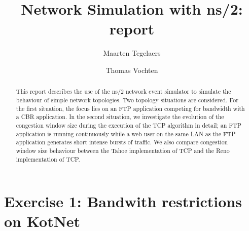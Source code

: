 \documentclass[a4paper,10pt]{article}
\title{Network Simulation with ns/2: report}
\author{Maarten Tegelaers \and Thomas Vochten}
\begin{document}
\maketitle

\begin{abstract}
This report describes the use of the ns/2 network event simulator to simulate the behaviour of simple network topologies.
Two topology situations are considered. For the first situation, the focus lies on an FTP application competing for bandwidth
with a CBR application. In the second situation, we investigate the evolution of the congestion window size during the
execution of the TCP algorithm in detail; an FTP application is running continuously while a web user on the same LAN as
the FTP application generates short intense bursts of traffic. We also compare congestion window size behaviour between
the Tahoe implementation of TCP and the Reno implementation of TCP.
\end{abstract}

\section{Exercise 1: Bandwith restrictions on KotNet}
\end{document}
